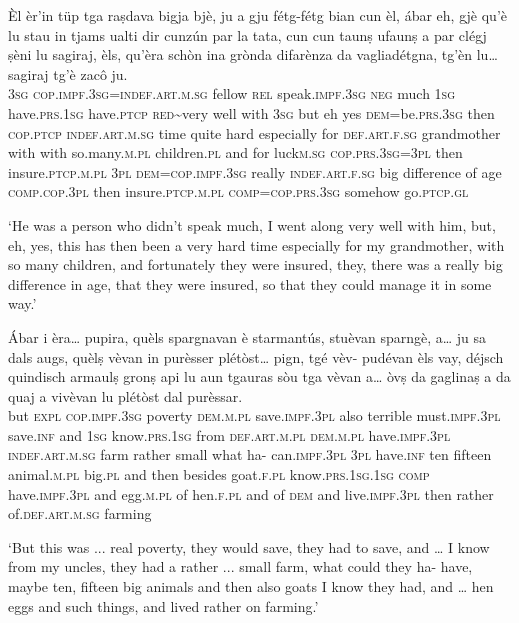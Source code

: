 \begin{linenumbers}
\gll  Èl èr’in tüp tga raṣdava bigja bjè, ju a gju fétg-fétg bian cun èl, ábar eh, gjè qu’è lu stau in tjams ualti dir cunzún par la tata, cun cun taunṣ ufaunṣ a par clégj ṣèni lu sagiraj, èls, qu’èra schòn ina grònda difarènza da vagliadétgna, tg'èn lu… sagiraj tg'è zacô ju. \\
  \textsc{3sg} \textsc{cop.impf.3sg=indef.art.m.sg} fellow \textsc{rel} speak.\textsc{impf.3sg} \textsc{neg} much \textsc{1sg} have.\textsc{prs.1sg} have.\textsc{ptcp} \textsc{red}\textasciitilde{very} well with \textsc{3sg} but eh yes \textsc{dem}=be.\textsc{prs.3sg} then \textsc{cop.ptcp} \textsc{indef.art.m.sg} time quite hard especially for \textsc{def.art.f.sg} grandmother with with so.many.\textsc{m.pl} children.\textsc{pl} and for luck\textsc{m.sg} \textsc{cop.prs.3sg=3pl} then insure.\textsc{ptcp.m.pl} \textsc{3pl} \textsc{dem=cop.impf.3sg} really \textsc{indef.art.f.sg} big difference of age \textsc{comp}.\textsc{cop.3pl} then insure.\textsc{ptcp.m.pl} \textsc{comp=cop.prs.3sg} somehow go.\textsc{ptcp.gl}   \\
\end{linenumbers}
\medskip
\glt `He was a person who didn’t speak much, I went along very well with him, but, eh, yes, this has then been a very hard time especially for my grandmother, with so many children, and fortunately they were insured, they, there was a really big difference in age, that they were insured, so that they could manage it in some way.'
\medskip

\begin{linenumbers}
\gll   Ábar i èra… pupira, quèls spargnavan è starmantús, stuèvan sparngè, a… ju sa dals augs, quèlṣ vèvan in purèsser plétòst… pign, tgé vèv- pudévan èls vay, déjsch quindisch armaulṣ gronṣ api lu aun tgauras sòu tga vèvan a… òvṣ da gaglinaṣ a da quaj a vivèvan lu plétòst dal purèssar. \\
 but \textsc{expl}  \textsc{cop.impf.3sg} poverty \textsc{dem.m.pl} save.\textsc{impf.3pl} also terrible must.\textsc{impf.3pl} save.\textsc{inf} and \textsc{1sg} know.\textsc{prs.1sg} from \textsc{def.art.m.pl} \textsc{dem.m.pl} have.\textsc{impf.3pl} \textsc{indef.art.m.sg} farm  rather small what ha- can.\textsc{impf.3pl} \textsc{3pl} have.\textsc{inf} ten fifteen animal.\textsc{m.pl} big.\textsc{pl} and then besides goat.\textsc{f.pl}  know.\textsc{prs.1sg.1sg} \textsc{comp} have.\textsc{impf.3pl} and  egg.\textsc{m.pl} of hen.\textsc{f.pl} and of \textsc{dem} and live.\textsc{impf.3pl} then rather of.\textsc{def.art.m.sg} farming\\
\end{linenumbers}
\medskip
\glt `But this was ... real poverty, they would save, they had to save, and … I know from my uncles, they had a rather ... small farm, what could they ha- have, maybe ten, fifteen big animals and then also goats I know they had, and … hen eggs and such things, and lived rather on farming.'
\medskip

